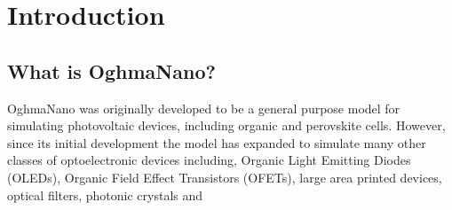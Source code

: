 \chapter{Introduction}
\section{What is OghmaNano?} 

OghmaNano was originally developed to be a general purpose model for simulating photovoltaic devices, including organic and perovskite cells. However, since its initial development the model has expanded to simulate many other classes of optoelectronic devices including, Organic Light Emitting Diodes (OLEDs), Organic Field Effect Transistors (OFETs), large area printed devices, optical filters, photonic crystals and 
